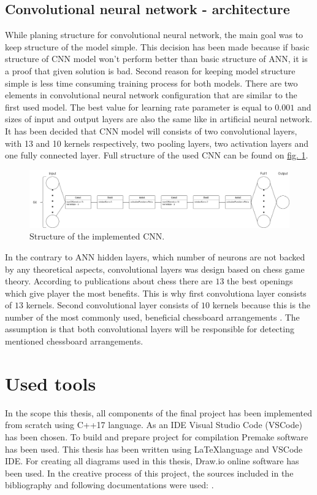 \subsection{Convolutional neural network - architecture}
While planing structure for convolutional neural network, the main goal was to keep structure of the model simple. This decision has been made because if basic structure of CNN model won't perform better than basic structure of ANN, it is a proof that given solution is bad. Second reason for keeping model structure simple is less time consuming training process for both models. There are two elements in convolutional neural network configuration that are similar to the first used model. The best value for learning rate parameter is equal to $0.001$ and sizes of input and output layers are also the same like in artificial neural network. It has been decided that CNN model will consists of two convolutional layers, with 13 and 10 kernels respectively, two pooling layers, two activation layers and one fully connected layer. Full structure of the used CNN can be found on \hyperref[fig:cnn-structure]{fig. \ref*{fig:cnn-structure}}.
\begin{figure}
	\centering
	\includegraphics[width=\textwidth]{dependencies/pictures/CNN_Structure.png}
	\caption{Structure of the implemented CNN.}
	\label{fig:cnn-structure}
\end{figure}
In the contrary to ANN hidden layers, which number of neurons are not backed by any theoretical aspects, convolutional layers was design based on chess game theory. According to publications about chess there are $13$ the best openings which give player the most benefits. This is why first convolutiona layer consists of $13$ kernels. Second convolutional layer consists of $10$ kernels because this is the number of the most commonly used, beneficial chessboard arrangements \cite{bib:book-mastering-chess-logic,bib:book-chess-bible,bib:book-bobby-fisher-teaches-chess}. The assumption is that both convolutional layers will be responsible for detecting mentioned chessboard arrangements.

\section{Used tools}
In the scope this thesis, all components of the final project has been implemented from scratch using C++17 language. As an IDE Visual Studio Code (VSCode) has been chosen. To build and prepare project for compilation Premake software has been used. This thesis has been written using \LaTeX language and VSCode IDE. For creating all diagrams used in this thesis, Draw.io online software has been used. In the creative process of this project, the sources included in the bibliography and following documentations were used: \cite{bib:internet-c++-doc,bib:internet-latex-doc,bib:internet-vscode-doc,bib:internet-premake-doc}.

